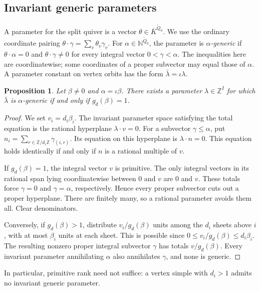 \documentclass[11pt, reqno]{amsart}
\numberwithin{equation}{section}
\newtheorem{proposition}[theorem]{Proposition}
\theoremstyle{definition}
\theoremstyle{remark}
\newcommand{\mb}[1]{\mathbb{#1}}
\newcommand{\Qbar}{\widetilde Q}
\newcommand{\Kbar}{\overline K}
\begin{document}
\subsection{Invariant generic parameters}

A parameter for the split quiver is a vector
$\theta\in\Kbar^{\Qbar_0}$. We use the ordinary coordinate pairing
$\theta\cdot\gamma=\sum_v\theta_v\gamma_v$. For
$\alpha\in\mb N^{\Qbar_0}$, the parameter is
\emph{$\alpha$-generic} if $\theta\cdot\alpha=0$ and
$\theta\cdot\gamma\ne0$ for every integral vector
$0<\gamma<\alpha$. The inequalities here are coordinatewise; some
coordinates of a proper subvector may equal those of $\alpha$.
A parameter constant on vertex orbits has the form
$\bar\lambda=\iota\lambda$.

\begin{proposition}\label{prop:genericity}
Let $\beta\ne0$ and $\alpha=\iota\beta$. There exists a parameter
$\lambda\in\mb Z^I$ for which $\bar\lambda$ is
$\alpha$-generic if and only if $g_d(\beta)=1$.
\end{proposition}
\begin{proof}
We set $v_i=d_i\beta_i$. The invariant parameter space satisfying the
total equation is the rational hyperplane $\lambda\cdot v=0$.
For a subvector $\gamma\leq\alpha$, put
$n_i=\sum_{r\in\mb Z/d_i\mb Z}\gamma_{(i,r)}$.
Its equation on this hyperplane is $\lambda\cdot n=0$.
This equation holds identically if and only if $n$ is a rational
multiple of $v$.

If $g_d(\beta)=1$, the integral vector $v$ is primitive. The only integral vectors in its rational span lying coordinatewise
between $0$ and $v$ are $0$ and $v$. These totals force $\gamma=0$ and $\gamma=\alpha$,
respectively. Hence every proper subvector cuts out a proper
hyperplane. There are finitely many, so a rational parameter avoids
them all. Clear denominators.

Conversely, if $g_d(\beta)>1$, distribute $v_i/g_d(\beta)$ units among the
$d_i$ sheets above $i$, with at most $\beta_i$ units at each sheet.
This is possible since $0\leq v_i/g_d(\beta)\leq d_i\beta_i$. The resulting
nonzero proper integral subvector $\gamma$ has totals $v/g_d(\beta)$.
Every invariant parameter annihilating $\alpha$ also annihilates
$\gamma$, and none is generic.
\end{proof}

In particular, primitive rank need not suffice: a vertex simple
with $d_i>1$ admits no invariant generic parameter.
\end{document}
